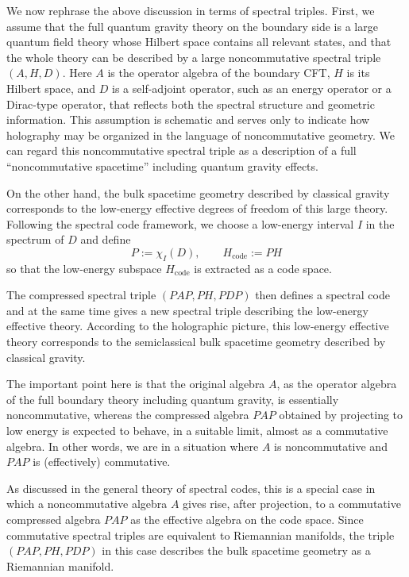 \documentclass[12pt]{article}
\theoremstyle{definition} %
\theoremstyle{plain} %
\theoremstyle{remark} %
\theoremstyle{underline}
\begin{document}
We now rephrase the above discussion in terms of spectral triples.
First, we assume that the full quantum gravity theory on the boundary side is a large quantum field theory whose Hilbert space contains all relevant states, and that the whole theory can be described by a large noncommutative spectral triple $(A,H,D)$.
Here $A$ is the operator algebra of the boundary CFT, $H$ is its Hilbert space, and $D$ is a self-adjoint operator, such as an energy operator or a Dirac-type operator, that reflects both the spectral structure and geometric information.
This assumption is schematic and serves only to indicate how holography may be organized in the language of noncommutative geometry.
We can regard this noncommutative spectral triple as a description of a full ``noncommutative spacetime'' including quantum gravity effects.

On the other hand, the bulk spacetime geometry described by classical gravity corresponds to the low-energy effective degrees of freedom of this large theory.
Following the spectral code framework, we choose a low-energy interval $I$ in the spectrum of $D$ and define
\[
    P := \chi_I(D), \qquad H_{\mathrm{code}} := P H
\]
so that the low-energy subspace $H_{\mathrm{code}}$ is extracted as a code space.

The compressed spectral triple $(PAP,PH,PDP)$ then defines a spectral code and at the same time gives a new spectral triple describing the low-energy effective theory.
According to the holographic picture, this low-energy effective theory corresponds to the semiclassical bulk spacetime geometry described by classical gravity.

The important point here is that the original algebra $A$, as the operator algebra of the full boundary theory including quantum gravity, is essentially noncommutative, whereas the compressed algebra $PAP$ obtained by projecting to low energy is expected to behave, in a suitable limit, almost as a commutative algebra.
In other words, we are in a situation where $A$ is noncommutative and $PAP$ is (effectively) commutative.

As discussed in the general theory of spectral codes, this is a special case in which a noncommutative algebra $A$ gives rise, after projection, to a commutative compressed algebra $PAP$ as the effective algebra on the code space.
Since commutative spectral triples are equivalent to Riemannian manifolds, the triple $(PAP,PH,PDP)$ in this case describes the bulk spacetime geometry as a Riemannian manifold.
\end{document}
